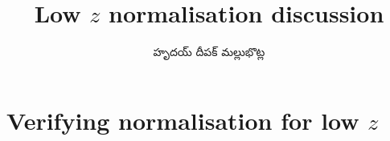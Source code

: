 \documentclass[../main.tex]{subfiles}
\title{Low $z$ normalisation discussion}
\author{\begin{telugu}హృదయ్ దీపక్ మల్లుభొట్ల\end{telugu}}
\date{}
\begin{document}
	\graphicspath{{\main/figures/}}

	\onlyinsubfile{\maketitle}

	\section{Verifying normalisation for low $z$} \label{sec:lowz:norm}
\end{document}
